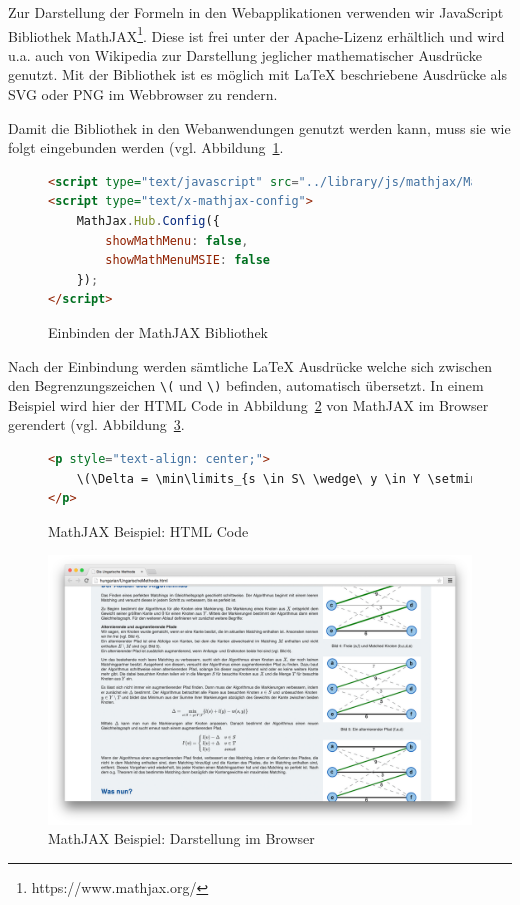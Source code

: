 Zur Darstellung der Formeln in den Webapplikationen verwenden wir JavaScript Bibliothek MathJAX\footnote{https://www.mathjax.org/}. Diese ist frei unter der Apache-Lizenz erhältlich und wird u.a. auch von Wikipedia zur Darstellung jeglicher mathematischer Ausdrücke genutzt. Mit der Bibliothek ist es möglich mit LaTeX beschriebene Ausdrücke als SVG oder PNG im Webbrowser zu rendern. 

Damit die Bibliothek in den Webanwendungen genutzt werden kann, muss sie wie folgt eingebunden werden (vgl. Abbildung~\ref{fig:listing-mathjax-include}.

\begin{figure}[h!]
\begin{lstlisting}[language=HTML]
<script type="text/javascript" src="../library/js/mathjax/MathJax.js?config=TeX-AMS-MML_SVG.js&locale=de"></script>
<script type="text/x-mathjax-config">
	MathJax.Hub.Config({
		showMathMenu: false,
		showMathMenuMSIE: false
	});
</script>
\end{lstlisting}
\caption[MathJAX Einbindung]{Einbinden der MathJAX Bibliothek}\label{fig:listing-mathjax-include}
\end{figure}

Nach der Einbindung werden sämtliche LaTeX Ausdrücke welche sich zwischen den Begrenzungszeichen \texttt{\textbackslash(} und \texttt{\textbackslash)} befinden, automatisch übersetzt. In einem Beispiel wird hier der HTML Code in Abbildung~\ref{fig:listing-mathjax-example-html} von MathJAX im Browser gerendert (vgl. Abbildung~\ref{fig:mathjax-example-img}.

\begin{figure}[h!]
\begin{lstlisting}[language=HTML]
<p style="text-align: center;">
	\(\Delta = \min\limits_{s \in S\ \wedge\ y \in Y \setminus T}\{l(s) + l(y) - w(s,y)\}\)
</p>
\end{lstlisting}
\caption[MathJAX Beispiel Code]{MathJAX Beispiel: HTML Code}\label{fig:listing-mathjax-example-html}
\end{figure}

\begin{figure}[h!]
	\centering
	\includegraphics[width=\textwidth]{figures/mathjax-example}
	\caption[MathJAX Beispiel Browser]{MathJAX Beispiel: Darstellung im Browser}\label{fig:mathjax-example-img}
\end{figure}

